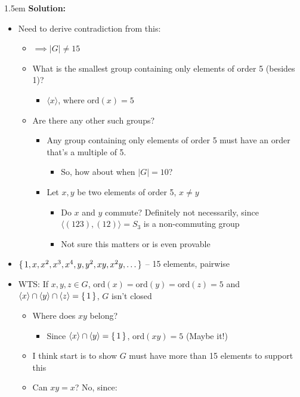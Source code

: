 \documentclass{article}
\newenvironment{solution}{
	\vspace{.5em}
	\par
	\begin{adjustwidth}{1.5em}{}
	\textbf{{Solution:}}
	\par
	\vspace{.5em}
}{
	\vspace{1em}
	\end{adjustwidth}
	\setcounter{step}{0}
	\newpage
}
\newcounter{step}
\newcommand{\ord}[1]{\text{ord}({#1})}
\newcommand{\gen}[1]{\langle {#1} \rangle}
\begin{document}
\begin{solution}
\begin{itemize}
\begin{itemize}
			\begin{itemize}
				\item $\implies$ every element in $G \setminus \set{1}$ must be order 5
				\item $\implies \forall x, y \in G$, $x, y \neq 1$, $\ord{xy} = 5$
			\end{itemize}
		\end{itemize}
		\item Need to derive contradiction from this:
		\begin{itemize}
			\item $\implies |G| \neq 15$
			\item What is the smallest group containing only elements of order 5 (besides 1)?
			\begin{itemize}
				\item $\gen{x}$, where $\ord{x} = 5$
			\end{itemize}
			\item Are there any other such groups?
			\begin{itemize}
				\item Any group containing only elements of order 5 must have an order that's a multiple of 5.
				\begin{itemize}
					\item So, how about when $|G| = 10$?
				\end{itemize}
				\item Let $x, y$ be two elements of order 5, $x \neq y$
				\begin{itemize}
					\item Do $x$ and $y$ commute? Definitely not necessarily, since $\gen{(123), (12)} = S_{3}$ is a non-commuting group
					\item Not sure this matters or is even provable
				\end{itemize}
			\end{itemize}
		\end{itemize}
		\item $\set{1, x, x^{2}, x^{3}, x^{4}, y, y^{2}, xy, x^{2}y, \ldots}$ -- 15 elements, pairwise
		\item WTS: If $x, y, z \in G$, $\ord{x} = \ord{y} = \ord{z} = 5$ and $\gen{x} \cap \gen{y} \cap \gen{z} = \set{1}$, $G$ isn't closed
		\begin{itemize}
			\item Where does $xy$ belong?
			\begin{itemize}
				\item Since $\gen{x} \cap \gen{y} = \set{1}$, $\ord{xy} = 5$ (Maybe it!)
			\end{itemize}
			\item I think start is to show $G$ must have more than 15 elements to support this
			\item Can $xy = x$? No, since:
		\end{itemize}
	\end{itemize}


\end{solution}
\end{document}
